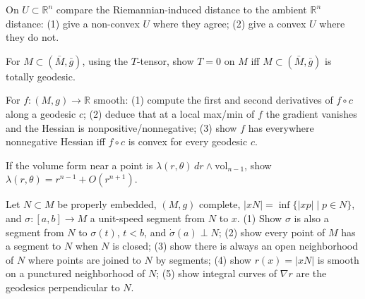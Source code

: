 \begin{remark}
  \label{rem:pet-ch5-ex-19}

  On $U\subset\mathbb R^n$ compare the Riemannian-induced distance to the ambient
  $\mathbb R^n$ distance: (1) give a non-convex $U$ where they agree; (2) give a
  convex $U$ where they do not.
\end{remark}

\begin{remark}
  \label{rem:pet-ch5-ex-20}

  For $M\subset(\bar M,\bar g)$, using the $T$-tensor, show $T=0$ on $M$ iff
  $M\subset(\bar M,\bar g)$ is totally geodesic.
\end{remark}

\begin{remark}
  \label{rem:pet-ch5-ex-21}

  For $f:(M,g)\to\mathbb R$ smooth: (1) compute the first and second derivatives of
  $f\circ c$ along a geodesic $c$; (2) deduce that at a local max/min of $f$ the
  gradient vanishes and the Hessian is nonpositive/nonnegative; (3) show $f$ has
  everywhere nonnegative Hessian iff $f\circ c$ is convex for every geodesic $c$.
\end{remark}

\begin{remark}
  \label{rem:pet-ch5-ex-22}

  If the volume form near a point is $\lambda(r,\theta)\,dr\wedge\mathrm{vol}_{n-1}$,
  show $\lambda(r,\theta)=r^{n-1}+O(r^{n+1})$.
\end{remark}

\begin{remark}
  \label{rem:pet-ch5-ex-23}

  Let $N\subset M$ be properly embedded, $(M,g)$ complete, $|xN|=\inf\{|xp|\mid
  p\in N\}$, and $\sigma:[a,b]\to M$ a unit-speed segment from $N$ to $x$. (1) Show
  $\sigma$ is also a segment from $N$ to $\sigma(t)$, $t<b$, and $\dot\sigma(a)\perp
  N$; (2) show every point of $M$ has a segment to $N$ when $N$ is closed; (3) show
  there is always an open neighborhood of $N$ where points are joined to $N$ by
  segments; (4) show $r(x)=|xN|$ is smooth on a punctured neighborhood of $N$; (5)
  show integral curves of $\nabla r$ are the geodesics perpendicular to $N$.
\end{remark}

